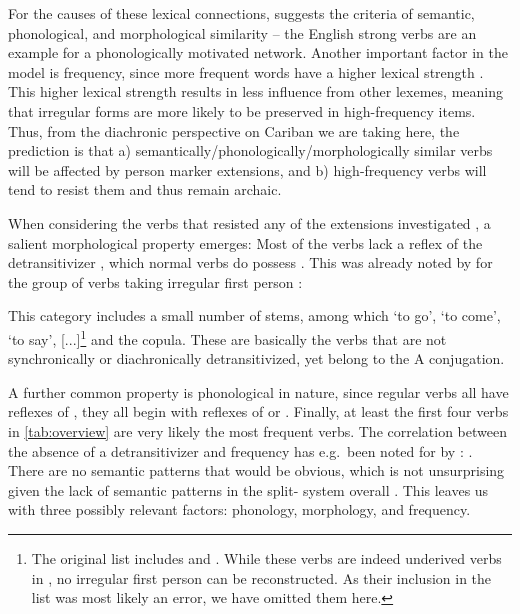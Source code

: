 For the causes of these lexical connections, \textcite[118]{bybee1985morphology} suggests the criteria of semantic, phonological, and morphological similarity -- the English strong verbs are an example for a phonologically motivated network.
Another important factor in the model is frequency, since more frequent words have a higher lexical strength \parencite[119]{bybee1985morphology}.
This higher lexical strength results in less influence from other lexemes, meaning that irregular forms are more likely to be preserved in high-frequency items.
Thus, from the diachronic perspective on Cariban we are taking here, the prediction is that a) semantically\slash{}phonologically\slash\hspace{0pt}morphologically similar verbs will be affected by person marker extensions, and b) high-frequency verbs will tend to resist them and thus remain archaic.

When considering the verbs that resisted any of the extensions investigated , a salient morphological property emerges:
Most of the verbs lack a reflex of the detransitivizer \detrz, which normal  verbs do possess .
This was already noted by \textcite{meira1998proto} for the group of \PTar verbs taking irregular first person :
\begin{quotebox}{\parencite[112]{meira1998proto}}
	This category includes a small number of stems, among which ‘to go’, ‘to come’, ‘to say’, [...]\footnote{The original list includes  and . While these verbs are indeed underived  verbs in \trio, no irregular first person  can be reconstructed. As their inclusion in the list was most likely an error, we have omitted them here.} and the copula. These are basically the verbs that are not synchronically or diachronically detransitivized, yet belong to the A conjugation.
\end{quotebox} %
%
A further common property is phonological in nature, since regular  verbs all have reflexes of \detrz, they all begin with reflexes of  or .
Finally, at least the first four verbs in \cref{tab:overview} are very likely the most frequent  verbs.
The correlation between the absence of a detransitivizer and frequency has e.g.\ been noted for \kalina by \textcite[75]{courtz2008carib}: .
%
There are no semantic patterns that would be obvious, which is not unsurprising given the lack of semantic patterns in the split- system overall .
This leaves us with three possibly relevant factors: phonology, morphology, and frequency.

